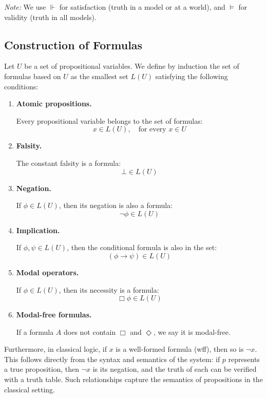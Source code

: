 \documentclass[12pt,a4paper,openany]{article}
\begin{document}
\textit{Note:} We use $\Vdash$ for satisfaction (truth in a model or at a world), and $\models$ for validity (truth in all models).

\subsection{Construction of Formulas}

Let $U$ be a set of propositional variables. We define by induction the set of formulas based on $U$ as the smallest set $L(U)$ satisfying the following conditions:

\begin{enumerate}
    \item \textbf{Atomic propositions.}
    
    Every propositional variable belongs to the set of formulas:
    $$x \in L(U), \quad \text{for every } x \in U$$
    
    \item \textbf{Falsity.}
    
    The constant falsity is a formula:
    $$\bot \in L(U)$$
    
    \item \textbf{Negation.}
    
    If $\phi \in L(U)$, then its negation is also a formula:
    $$\neg \phi \in L(U)$$
    
    \item \textbf{Implication.}
    
    If $\phi, \psi \in L(U)$, then the conditional formula is also in the set:
    $$(\phi \to \psi) \in L(U)$$
    
    \item \textbf{Modal operators.}
    
    If $\phi \in L(U)$, then its necessity is a formula:
    $$\Box \phi \in L(U)$$
    
    \item \textbf{Modal-free formulas.}
    
    If a formula $A$ does not contain $\Box$ and $\Diamond$, we say it is modal-free.
\end{enumerate}

Furthermore, in classical logic, if $x$ is a well-formed formula (wff), then so is $\neg x$. This follows directly from the syntax and semantics of the system: if $p$ represents a true proposition, then $\neg x$ is its negation, and the truth of each can be verified with a truth table. Such relationships capture the semantics of propositions in the classical setting.
\end{document}
